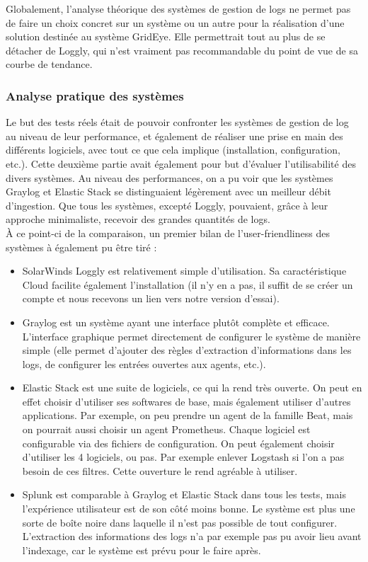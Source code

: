 \documentclass[paper=a4, fontsize=11pt]{scrartcl}
\begin{document}
Globalement, l'analyse théorique des systèmes de gestion de logs ne permet pas de faire un choix concret sur un système ou un autre pour la réalisation d'une solution destinée au système GridEye. Elle permettrait tout au plus de se détacher de Loggly, qui n'est vraiment pas recommandable du point de vue de sa courbe de tendance.
\subsubsection{Analyse pratique des systèmes}
Le but des tests réels était de pouvoir confronter les systèmes de gestion de log au niveau de leur performance, et également de réaliser une prise en main des différents logiciels, avec tout ce que cela implique (installation, configuration, etc.). Cette deuxième partie avait également pour but d'évaluer l'utilisabilité des divers systèmes.
Au niveau des performances, on a pu voir que les systèmes Graylog et Elastic Stack se distinguaient légèrement avec un meilleur débit d'ingestion. Que tous les systèmes, excepté Loggly, pouvaient, grâce à leur approche minimaliste, recevoir des grandes quantités de logs.\\
À ce point-ci de la comparaison, un premier bilan de l'\og user-friendliness \fg des systèmes à également pu être tiré :
\begin{itemize}
    \item SolarWinds Loggly est relativement simple d'utilisation. Sa caractéristique Cloud facilite également l'installation (il n'y en a pas, il suffit de se créer un compte et nous recevons un lien vers notre version d'essai).
    \item Graylog est un système ayant une interface plutôt complète et efficace. L'interface graphique permet directement de configurer le système de manière simple (elle permet d'ajouter des règles d'extraction d'informations dans les logs, de configurer les entrées ouvertes aux agents, etc.).
    \item Elastic Stack est une \og suite \fg de logiciels, ce qui la rend très ouverte. On peut en effet choisir d'utiliser ses softwares de base, mais également utiliser d'autres applications. Par exemple, on peu prendre un agent de la famille Beat, mais on pourrait aussi choisir un agent Prometheus. Chaque logiciel est configurable via des fichiers de configuration. On peut également choisir d'utiliser les 4 logiciels, ou pas. Par exemple enlever Logstash si l'on a pas besoin de ces filtres. Cette ouverture le rend agréable à utiliser.
    \item Splunk est comparable à Graylog et Elastic Stack dans tous les tests, mais l'expérience utilisateur est de son côté moins bonne. Le système est plus une sorte de \og boîte noire \fg dans laquelle il n'est pas possible de tout configurer. L'extraction des informations des logs n'a par exemple pas pu avoir lieu avant l'indexage, car le système est prévu pour le faire après.
\end{itemize}
\end{document}
